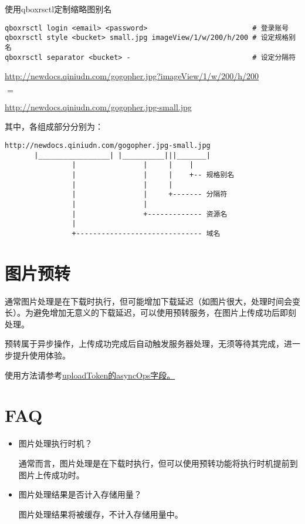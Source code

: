 \documentclass[11pt, oneside]{book}
\newcommand{\qhint}[1]{
\footnotesize
\vspace{0.2em}
\noindent
#1\par
\vspace{-0.5em}
\normalsize
}
\newcommand{\qsym}[1]{
\footnotesize
\noindent
#1\par
\normalsize
}
\newcommand{\qpara}[1]{
\vspace{0.3em}
\noindent
#1\par
\vspace{0.3em}
}
\newcommand{\qsamplelink}[1]{
\vspace{0.2em}
\noindent
#1\par
\vspace{0.1em}
}
\newcommand{\qurl}[1]{\footnotesize\url{#1}\normalsize}
\begin{document}
\begin{sample}
  \caption{使用qboxrsctl定制缩略图别名}
    \begin{lstlisting}
qboxrsctl login <email> <password>                         # 登录账号
qboxrsctl style <bucket> small.jpg imageView/1/w/200/h/200 # 设定规格别名
qboxrsctl separator <bucket> -                             # 设定分隔符
    \end{lstlisting}

    \linebreak
    \qsamplelink{\qurl{http://newdocs.qiniudn.com/gogopher.jpg?imageView/1/w/200/h/200}}
    \qsym{$=$}
    \qurl{http://newdocs.qiniudn.com/gogopher.jpg-small.jpg}
    \linebreak

\qhint{其中，各组成部分分别为：}
\begin{lstlisting}
http://newdocs.qiniudn.com/gogopher.jpg-small.jpg
       |_________________| |__________|||_______|
                |                |     |    |
                |                |     |    +-- 规格别名
                |                |     |    
                |                |     +------- 分隔符
                |                |
                |                +------------- 资源名
                |
                +------------------------------ 域名
\end{lstlisting}
\end{sample}

\clearpage

\section{图片预转}

\qpara{通常图片处理是在下载时执行，但可能增加下载延迟（如图片很大，处理时间会变长）。为避免增加无意义的下载延迟，可以使用预转服务，在图片上传成功后即刻处理。}
\qpara{预转属于异步操作，上传成功完成后自动触发服务器处理，无须等待其完成，进一步提升使用体验。}
\qpara{使用方法请参考\href{http://docs.qiniu.com/api/v6/put.html\#uploadToken-asyncOps}{uploadToken的asyncOps字段。}}

\clearpage

\section{FAQ}

\begin{itemize}
  \item 图片处理执行时机？\par
  \qhint{通常而言，图片处理是在下载时执行，但可以使用预转功能将执行时机提前到图片上传成功时。}

  \item 图片处理结果是否计入存储用量？\par
  \qhint{图片处理结果将被缓存，不计入存储用量中。}
\end{itemize}
\end{document}
